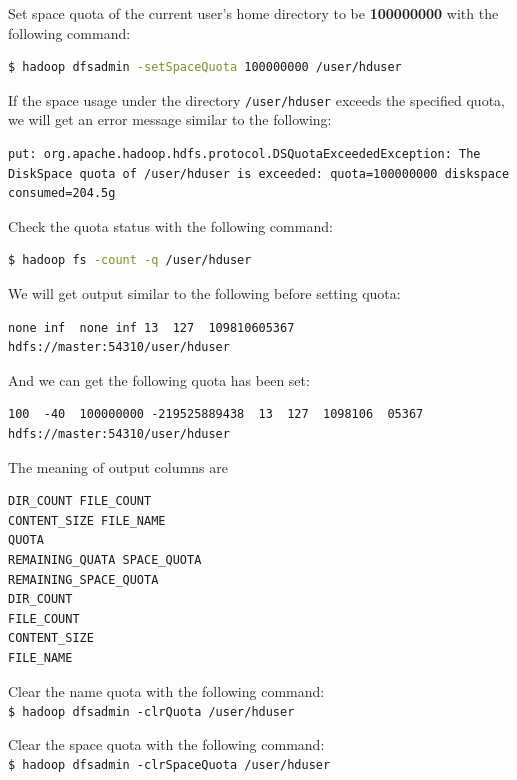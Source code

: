 Set space quota of the current user's home directory to be \textbf{100000000} with the following command:
\lstset{style=bashstyle}
\begin{lstlisting}[language=bash]
$ hadoop dfsadmin -setSpaceQuota 100000000 /user/hduser
\end{lstlisting}

If the space usage under the directory \verb|/user/hduser| exceeds the specified quota, we will get an error message similar to the following: \\
\lstset{style=bashstyle}
\begin{lstlisting}
put: org.apache.hadoop.hdfs.protocol.DSQuotaExceededException: The DiskSpace quota of /user/hduser is exceeded: quota=100000000 diskspace consumed=204.5g
\end{lstlisting}

Check the quota status with the following command:
\lstset{style=bashstyle}
\begin{lstlisting}[language=bash]
$ hadoop fs -count -q /user/hduser
\end{lstlisting}
We will get output similar to the following before setting quota: \\
\lstset{style=bashstyle}
\begin{lstlisting}
none inf  none inf 13  127  109810605367 hdfs://master:54310/user/hduser
\end{lstlisting}

And we can get the following quota has been set:
\lstset{style=bashstyle}
\begin{lstlisting}
100  -40  100000000 -219525889438  13  127  1098106  05367 hdfs://master:54310/user/hduser
\end{lstlisting}

The meaning of output columns are 
\begin{verbatim}
DIR_COUNT FILE_COUNT 
CONTENT_SIZE FILE_NAME
QUOTA
REMAINING_QUATA SPACE_QUOTA
REMAINING_SPACE_QUOTA
DIR_COUNT 
FILE_COUNT 
CONTENT_SIZE 
FILE_NAME
\end{verbatim}

Clear the name quota with the following command: \\
\verb|$ hadoop dfsadmin -clrQuota /user/hduser|

Clear the space quota with the following command: \\
\verb|$ hadoop dfsadmin -clrSpaceQuota /user/hduser|

